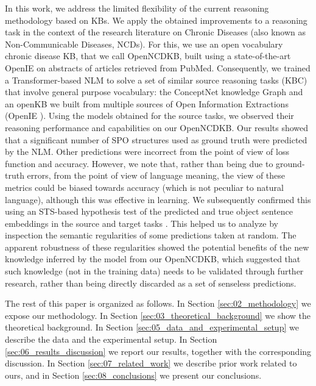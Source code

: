 \documentclass[preprint]{elsarticle}
\begin{document}
In this work, we address the limited flexibility of the current reasoning methodology based on KBs. We apply the obtained improvements to a reasoning task in the context of the research literature on Chronic Diseases (also known as Non-Communicable Diseases, NCDs). For this, we use an open vocabulary chronic disease KB, that we call OpenNCDKB, built using a state-of-the-art OpenIE on abstracts of articles retrieved from PubMed. Consequently, we trained a Transformer-based NLM to solve a set of similar source reasoning tasks (KBC) that involve general purpose vocabulary: the ConceptNet knowledge Graph and an openKB we built from multiple sources of Open Information Extractions (OpenIE \cite{etzioni2008open,fader2011identifying}). Using the models obtained for the source tasks, we observed their reasoning performance and capabilities on our OpenNCDKB. 
Our results showed that a significant number of SPO structures used as ground truth were predicted by the NLM. Other predictions were incorrect from the point of view of loss function and accuracy. However, we note that, rather than being due to ground-truth errors, from the point of view of language meaning, the view of these metrics could be biased towards accuracy (which is not peculiar to natural language), although this was effective in learning. We subsequently confirmed this using an STS-based hypothesis test of the predicted and true object sentence embeddings in the source and target tasks \cite{arroyo2019unsupervised,wang2021distributed}. %
This helped us to analyze by inspection the semantic regularities of some predictions taken at random. The apparent robustness of these regularities showed the potential benefits of the new knowledge inferred by the model from our OpenNCDKB, which suggested that such knowledge (not in the training data) needs to be validated through further research, rather than being directly discarded as a set of senseless predictions.

The rest of this paper is organized as follows. In Section \ref{sec:02_methodology} we expose our methodology. In Section \ref{sec:03_theoretical_background} we show the theoretical background. In Section \ref{sec:05_data_and_experimental_setup} we describe the data and the experimental setup. In Section \ref{sec:06_results_discussion} we report our results, together with the corresponding discussion. In Section \ref{sec:07_related_work} we describe prior work related to ours, and in Section \ref{sec:08_conclusions} we present our conclusions.
\end{document}
